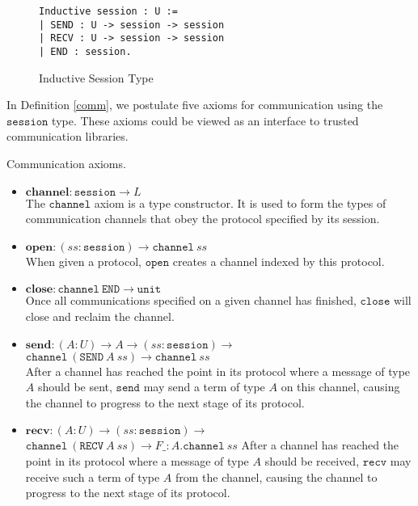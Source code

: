 \documentclass[sigplan,screen,review,anonymous]{acmart}
\newcommand{\unit}{\texttt{unit}}
\newcommand{\session}{\texttt{session}}
\newcommand{\channel}{\texttt{channel}}
\newcommand{\open}{\texttt{open}}
\newcommand{\close}{\texttt{close}}
\newcommand{\send}{\texttt{send}}
\newcommand{\recv}{\texttt{recv}}
\newcommand{\SEND}{\texttt{SEND}}
\newcommand{\RECV}{\texttt{RECV}}
\newcommand{\END}{\texttt{END}}
\begin{document}
\begin{figure}[h]
  \caption{Inductive Session Type}
  \begin{verbatim}
Inductive session : U :=
| SEND : U -> session -> session
| RECV : U -> session -> session
| END : session.
  \end{verbatim}
  \label{session}
  \Description{}
\end{figure}

In Definition \ref{comm}, we postulate five axioms for communication using the $\session$ type. These axioms could be viewed as an interface to trusted communication libraries.

\begin{definition}
  Communication axioms.
  \begin{itemize}
    \item $\textbf{channel} : \session \rightarrow L$ \\
          The $\channel$ axiom is a type constructor. It is used to form the types of communication channels that obey the protocol specified by its session.
    \item $\textbf{open} : (ss : \session) \rightarrow \channel\ ss$ \\
          When given a protocol, $\open$ creates a channel indexed by this protocol.
    \item $\textbf{close} : \channel\ \END \rightarrow \unit$ \\
          Once all communications specified on a given channel has finished, $\close$ will close and reclaim the channel.
    \item $\textbf{send} : (A : U) \rightarrow A \rightarrow (ss : \session) \rightarrow$ \\
          \phantom{send : (A :)}
          $\channel\ (\SEND\ A\ ss) \rightarrow \channel\ ss$ \\
          After a channel has reached the point in its protocol where a message of type $A$ should be sent, $\send$ may send a term of type $A$ on this channel, causing the channel to progress to the next stage of its protocol.
    \item $\textbf{recv} : (A : U) \rightarrow (ss : \session) \rightarrow $ \\
          \phantom{recv : (A :)}
          $\channel\ (\RECV\ A\ ss) \rightarrow F \_:A.\channel\ ss$
          After a channel has reached the point in its protocol where a message of type $A$ should be received, $\recv$ may receive such a term of type $A$ from the channel, causing the channel to progress to the next stage of its protocol.
  \end{itemize}
  \label{comm}
\end{definition}
\end{document}
